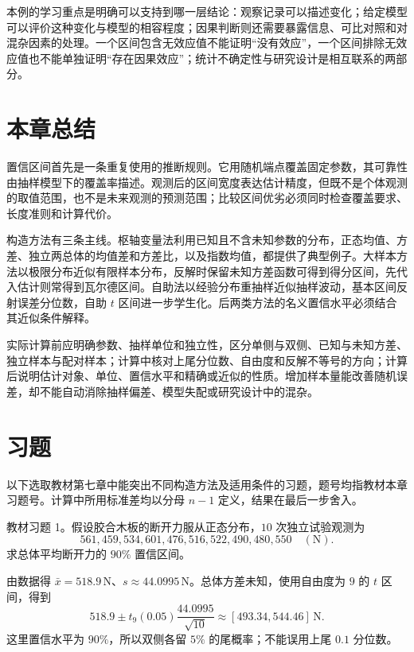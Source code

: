 本例的学习重点是明确可以支持到哪一层结论：观察记录可以描述变化；给定模型可以评价这种变化与模型的相容程度；因果判断则还需要暴露信息、可比对照和对混杂因素的处理。一个区间包含无效应值不能证明“没有效应”，一个区间排除无效应值也不能单独证明“存在因果效应”；统计不确定性与研究设计是相互联系的两部分。

\section*{本章总结}

置信区间首先是一条重复使用的推断规则。它用随机端点覆盖固定参数，其可靠性由抽样模型下的覆盖率描述。观测后的区间宽度表达估计精度，但既不是个体观测的取值范围，也不是未来观测的预测范围；比较区间优劣必须同时检查覆盖要求、长度准则和计算代价。

构造方法有三条主线。枢轴变量法利用已知且不含未知参数的分布，正态均值、方差、独立两总体的均值差和方差比，以及指数均值，都提供了典型例子。大样本方法以极限分布近似有限样本分布，反解时保留未知方差函数可得到得分区间，先代入估计则常得到瓦尔德区间。自助法以经验分布重抽样近似抽样波动，基本区间反射误差分位数，自助 $t$ 区间进一步学生化。后两类方法的名义置信水平必须结合其近似条件解释。

实际计算前应明确参数、抽样单位和独立性，区分单侧与双侧、已知与未知方差、独立样本与配对样本；计算中核对上尾分位数、自由度和反解不等号的方向；计算后说明估计对象、单位、置信水平和精确或近似的性质。增加样本量能改善随机误差，却不能自动消除抽样偏差、模型失配或研究设计中的混杂。

\section*{习题}

以下选取教材第七章中能突出不同构造方法及适用条件的习题，题号均指教材本章习题号。计算中所用标准差均以分母 $n-1$ 定义，结果在最后一步舍入。

\begin{example}
\label{ex:study-ci-exercise-glue}
教材习题 1。假设胶合木板的断开力服从正态分布，$10$ 次独立试验观测为
\[
  561,459,534,601,476,516,522,490,480,550
  \quad(\mathrm N).
\]
求总体平均断开力的 $90\%$ 置信区间。
\end{example}
\begin{solve}
由数据得 $\bar x=518.9\,\mathrm N$、$s\approx44.0995\,\mathrm N$。总体方差未知，使用自由度为 $9$ 的 $t$ 区间，得到
\[
  518.9\pm t_9(0.05)\frac{44.0995}{\sqrt{10}}
  \approx[493.34,544.46]\,\mathrm N.
\]
这里置信水平为 $90\%$，所以双侧各留 $5\%$ 的尾概率；不能误用上尾 $0.1$ 分位数。
\end{solve}


